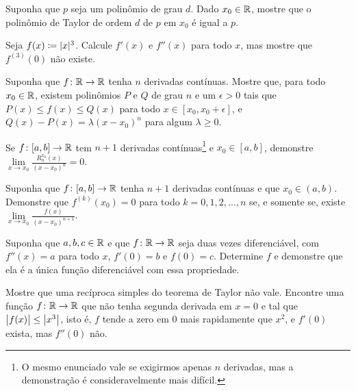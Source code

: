 \begin{exercise}
Suponha que $p$ seja um polinômio de grau $d$. Dado $x_0 \in {\mathbb{R}}$, mostre que o polinômio de Taylor de ordem $d$ de $p$ em $x_0$ é igual a $p$.
\end{exercise}

\begin{exercise}
Seja $f(x) \coloneqq \lvert {x} \rvert^3$. Calcule $f'(x)$ e $f''(x)$ para todo $x$, mas mostre que $f^{(3)}(0)$ não existe.
\end{exercise}

\begin{exercise}
Suponha que $f \colon {\mathbb{R}} \to {\mathbb{R}}$ tenha $n$ derivadas contínuas. Mostre que, para todo $x_0 \in {\mathbb{R}}$, existem polinômios $P$ e $Q$ de grau $n$ e um $\epsilon>0$ tais que $P(x) \leq f(x) \leq Q(x)$ para todo $x \in [x_0,x_0+\epsilon]$, e $Q(x)-P(x)=\lambda {(x-x_0)}^n$ para algum $\lambda \geq 0$.
\end{exercise}

\begin{exercise}
Se $f \colon [a,b] \to {\mathbb{R}}$ tem $n+1$ derivadas contínuas\footnote{%
O mesmo enunciado vale se exigirmos apenas $n$ derivadas, mas a demonstração é consideravelmente mais difícil.
}
e $x_0 \in [a,b]$, demonstre
$\lim\limits_{x\to x_0} \frac{R_n^{x_0}(x)}{{(x-x_0)}^n} = 0$.
\end{exercise}

\begin{exercise}
Suponha que $f \colon [a,b] \to {\mathbb{R}}$ tenha $n+1$ derivadas contínuas e que $x_0 \in (a,b)$. Demonstre que $f^{(k)}(x_0)=0$ para todo $k=0,1,2,\ldots,n$
se, e somente se, existe $\lim\limits_{x\to x_0} \frac{f(x)}{{(x-x_0)}^{n+1}}$.
\end{exercise}

\begin{exercise}
Suponha que $a,b,c \in {\mathbb{R}}$ e que $f \colon {\mathbb{R}} \to {\mathbb{R}}$ seja duas vezes diferenciável, com $f''(x)=a$ para todo $x$, $f'(0)=b$ e $f(0)=c$. Determine $f$ e demonstre que ela é a única função diferenciável com essa propriedade.
\end{exercise}

\begin{exercise}[Desafiador]
Mostre que uma recíproca simples do teorema de Taylor não vale. Encontre uma função $f \colon {\mathbb{R}} \to {\mathbb{R}}$ que não tenha segunda derivada em $x=0$ e tal que
$\bigl\lvert {f(x)} \bigr\rvert \leq \bigl\lvert {x^3} \bigr\rvert$, isto é, $f$ tende a zero em $0$ mais rapidamente que $x^2$, e $f'(0)$ exista, mas $f''(0)$ não.
\end{exercise}

